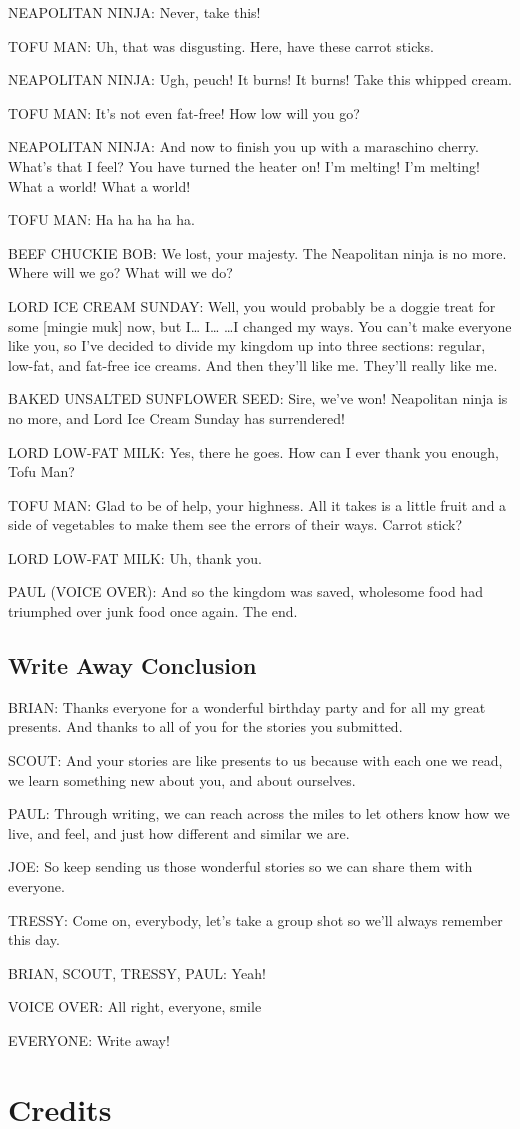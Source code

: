 NEAPOLITAN NINJA:
Never, take this!

TOFU MAN:
Uh, that was disgusting.
Here, have these carrot sticks.

NEAPOLITAN NINJA:
Ugh, peuch!
It burns! It burns!
Take this whipped cream.

TOFU MAN:
It's not even fat-free!
How low will you go?

NEAPOLITAN NINJA:
And now to finish you up with a maraschino cherry.
What's that I feel?
You have turned the heater on!
I'm melting!
I'm melting!
What a world!
What a world!

TOFU MAN:
Ha ha ha ha ha.

BEEF CHUCKIE BOB:
We lost, your majesty.
The Neapolitan ninja is no more.
Where will we go?
What will we do?

LORD ICE CREAM SUNDAY:
Well, you would probably be a doggie treat for some [mingie muk] now, but I\dots
I\dots
\dots I changed my ways.
You can't make everyone like you, so I've decided to divide my kingdom up into three sections: regular, low-fat, and fat-free ice creams.
And then they'll like me.
They'll really like me.

BAKED UNSALTED SUNFLOWER SEED:
Sire, we've won!
Neapolitan ninja is no more, and Lord Ice Cream Sunday has surrendered!

LORD LOW-FAT MILK:
Yes, there he goes.
How can I ever thank you enough, Tofu Man?

TOFU MAN:
Glad to be of help, your highness.
All it takes is a little fruit and a side of vegetables to make them see the errors of their ways.
Carrot stick?

LORD LOW-FAT MILK:
Uh, thank you.

PAUL (VOICE OVER):
And so the kingdom was saved, wholesome food had triumphed over junk food once again.
The end.

\subsection{Write Away Conclusion}

BRIAN:
Thanks everyone for a wonderful birthday party and for all my great presents.
And thanks to all of you for the stories you submitted.

SCOUT:
And your stories are like presents to us because with each one we read, we learn something new about you, and about ourselves.

PAUL:
Through writing, we can reach across the miles to let others know how we live, and feel, and just how different and similar we are.

JOE:
So keep sending us those wonderful stories so we can share them with everyone.

TRESSY:
Come on, everybody, let's take a group shot so we'll always remember this day.

BRIAN, SCOUT, TRESSY, PAUL:
Yeah!

VOICE OVER:
All right, everyone, smile

EVERYONE:
Write away!

\section{Credits}